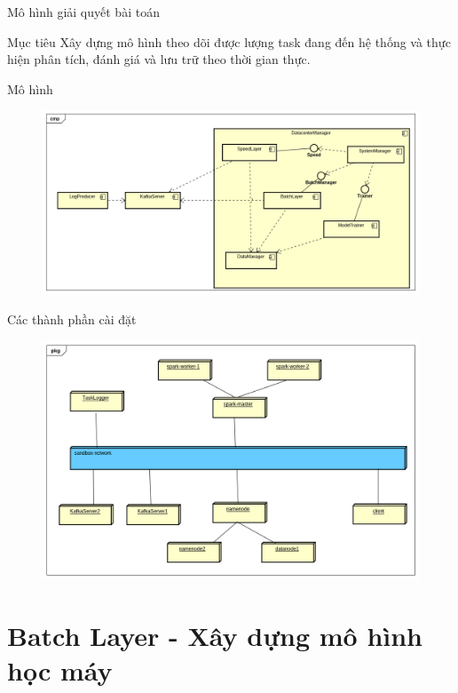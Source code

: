 \documentclass[10pt,xcolor={dvipsnames}]{beamer}
\begin{document}
	\begin{frame}
	{Mô hình giải quyết bài toán}
		\begin{block}
			{Mục tiêu}
			Xây dựng mô hình theo dõi được lượng task đang đến hệ thống và thực hiện phân tích, đánh giá và lưu trữ theo thời gian thực. 
		\end{block}
		\begin{block}
		{Mô hình}
		\begin{figure}
			\centering
			\includegraphics[scale=0.25]{images/LogStreamingComponents.png}
		\end{figure}
		\end{block}
	\end{frame}	
	
	\begin{frame}
	{Các thành phần cài đặt}
	\begin{figure}
		\centering
		\includegraphics[scale=0.25]{images/DeploymentDiagram.png}
	\end{figure}
	\end{frame}
	
	\section{Batch Layer - Xây dựng mô hình học máy}
	
\end{document}
